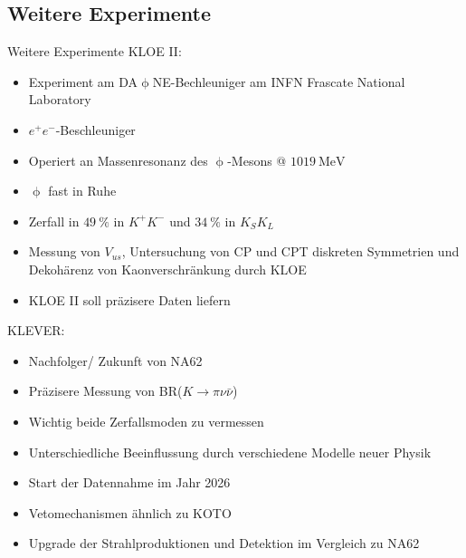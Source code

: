 \documentclass[aspectratio=1610, professionalfonts, 9pt, t]{beamer}
\begin{document}

  \subsection{Weitere Experimente}

  \begin{frame}{Weitere Experimente}
    KLOE II:
    \begin{itemize}
      \item Experiment am DA$\upphi$NE-Bechleuniger am INFN Frascate National Laboratory
      \item $e^+e^-$-Beschleuniger
      \item[\rightarrow] Operiert an Massenresonanz des $\upphi$-Mesons @ $\SI{1019}{\mega\electronvolt}$
      \item[\rightarrow] $\upphi$ fast in Ruhe
      \item[\rightarrow] Zerfall in $\SI{49}{\percent}$ in $K^+K^-$ und $\SI{34}{\percent}$ in $K_S K_L$
      \item Messung von $V_{us}$, Untersuchung von CP und CPT diskreten Symmetrien und Dekohärenz von Kaonverschränkung durch KLOE
      \item[\rightarrow] KLOE II soll präzisere Daten liefern
    \end{itemize}
  \end{frame}

  \begin{frame}
    KLEVER:
    \begin{itemize}
      \item Nachfolger/ Zukunft von NA62
      \item Präzisere Messung von BR($K \rightarrow \pi \nu \bar{\nu}$)
      \item Wichtig beide Zerfallsmoden zu vermessen %
      \item[\rightarrow] Unterschiedliche Beeinflussung durch verschiedene Modelle neuer Physik
      \item Start der Datennahme im Jahr 2026
      \item Vetomechanismen ähnlich zu KOTO
      \item Upgrade der Strahlproduktionen und Detektion im Vergleich zu NA62
    \end{itemize}
  \end{frame}
\end{document}
